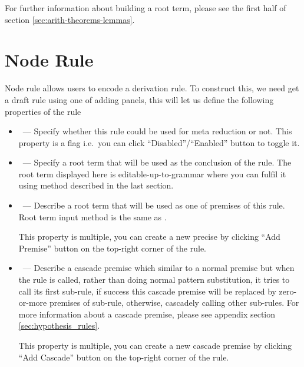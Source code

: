 \documentclass[master.tex]{subfiles}
\begin{document}
For further information about building a root term, please see the first half of
section \ref{sec:arith-theorems-lemmas}.

\section{Node Rule}

Node rule allows users to encode a derivation rule. To construct this, we need
get a draft rule using one of adding panels, this will let us define the
following properties of the rule

\begin{itemize}
\item \kAllowReduction\ --- Specify whether this rule could be used for meta
  reduction or not. This property is a flag i.e.\ you can click
  ``Disabled''/``Enabled'' button to toggle it.
\item \kConclusion\ --- Specify a root term that will be used as the conclusion
  of the rule. The root term displayed here is editable-up-to-grammar where you
  can fulfil it using method described in the last section.
\item \kPremise\ --- Describe a root term that will be used as one of premises
  of this rule. Root term input method is the same as \kConclusion{}.

  This property is multiple, you can create a new precise by clicking ``Add
  Premise'' button on the top-right corner of the rule.
\item \kCascade\ --- Describe a cascade premise which similar to a normal
  premise but when the rule is called, rather than doing normal pattern
  substitution, it tries to call its first sub-rule, if success this cascade
  premise will be replaced by zero-or-more premises of sub-rule, otherwise,
  cascadely calling other sub-rules. For more information about a cascade
  premise, please see appendix section \ref{sec:hypothesis_rules}.

  This property is multiple, you can create a new cascade premise by clicking
  ``Add Cascade'' button on the top-right corner of the rule.


\end{itemize}
\end{document}
